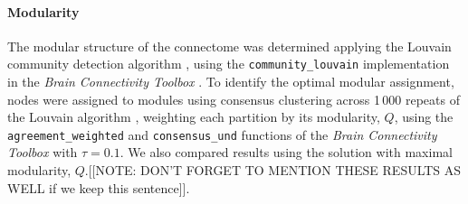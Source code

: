 \documentclass[10pt,letterpaper]{article}
\begin{document}
\paragraph{Modularity}
The modular structure of the connectome was determined applying the Louvain community detection algorithm \cite{Blondel:2008do}, using the \texttt{community\_louvain} implementation in the \emph{Brain Connectivity Toolbox} \cite{Rubinov2010}.
To identify the optimal modular assignment, nodes were assigned to modules using consensus clustering across 1\,000 repeats of the Louvain algorithm \cite{Lancichinetti2012}, weighting each partition by its modularity, $Q$, using the \texttt{agreement\_weighted} and \texttt{consensus\_und} functions of the \emph{Brain Connectivity Toolbox} \cite{Rubinov2010} with $\tau = 0.1$.
We also compared results using the solution with maximal modularity, $Q$.[[NOTE: DON'T FORGET TO MENTION THESE RESULTS AS WELL if we keep this sentence]].



\end{document}
